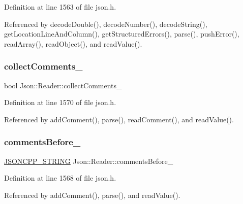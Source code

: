 Definition at line 1563 of file json.\+h.



Referenced by decode\+Double(), decode\+Number(), decode\+String(), get\+Location\+Line\+And\+Column(), get\+Structured\+Errors(), parse(), push\+Error(), read\+Array(), read\+Object(), and read\+Value().

\mbox{\label{class_json_1_1_reader_a8e9ce743f6004f0596692f0a9ee4626c}} 
\subsubsection{\texorpdfstring{collect\+Comments\+\_\+}{collectComments\_}}
{\footnotesize\ttfamily bool Json\+::\+Reader\+::collect\+Comments\+\_\+\hspace{0.3cm}{\ttfamily [private]}}



Definition at line 1570 of file json.\+h.



Referenced by add\+Comment(), parse(), read\+Comment(), and read\+Value().

\mbox{\label{class_json_1_1_reader_af777967adaf0b2e882efa07673754381}} 
\subsubsection{\texorpdfstring{comments\+Before\+\_\+}{commentsBefore\_}}
{\footnotesize\ttfamily \hyperlink{json_8h_a1e723f95759de062585bc4a8fd3fa4be}{J\+S\+O\+N\+C\+P\+P\+\_\+\+S\+T\+R\+I\+NG} Json\+::\+Reader\+::comments\+Before\+\_\+\hspace{0.3cm}{\ttfamily [private]}}



Definition at line 1568 of file json.\+h.



Referenced by add\+Comment(), parse(), and read\+Value().

\mbox{\label{class_json_1_1_reader_a2f2feb5201a26da7aa133d2f7434479b}} 
